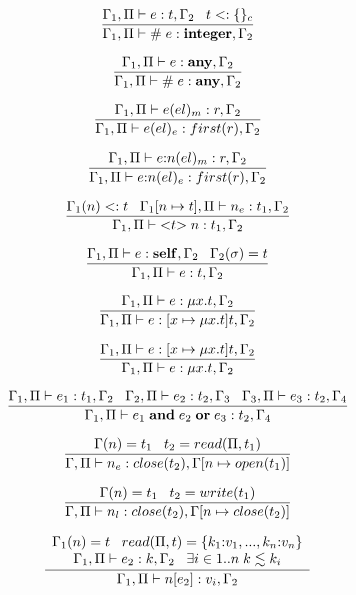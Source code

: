 \[
\dfrac{\Gamma_{1}, \Pi \vdash e:t, \Gamma_{2} \;\;\;
       t <: \{\}_{c}}
      {\Gamma_{1}, \Pi \vdash \# \; e:\mathbf{integer}, \Gamma_{2}}
\]

\[
\dfrac{\Gamma_{1}, \Pi \vdash e:\mathbf{any}, \Gamma_{2}}
      {\Gamma_{1}, \Pi \vdash \# \; e:\mathbf{any}, \Gamma_{2}}
\]

\[
\dfrac{\Gamma_{1}, \Pi \vdash e(el)_{m}:r, \Gamma_{2}}
      {\Gamma_{1}, \Pi \vdash e(el)_{e}:first(r), \Gamma_{2}}
\]

\[
\dfrac{\Gamma_{1}, \Pi \vdash e{:}n(el)_{m}:r, \Gamma_{2}}
      {\Gamma_{1}, \Pi \vdash e{:}n(el)_{e}:first(r), \Gamma_{2}}
\]

\[
\dfrac{\Gamma_{1}(n) <: t \;\;\;
       \Gamma_{1}[n \mapsto t], \Pi \vdash n_{e}:t_{1}, \Gamma_{2}}
      {\Gamma_{1}, \Pi \vdash {<}t{>} \; n:t_{1}, \Gamma_{2}}
\]

\[
\dfrac{\Gamma_{1}, \Pi \vdash e:\mathbf{self}, \Gamma_{2} \;\;\;
       \Gamma_{2}(\sigma) = t}
      {\Gamma_{1}, \Pi \vdash e:t, \Gamma_{2}}
\]

\[
\dfrac{\Gamma_{1}, \Pi \vdash e:\mu x.t, \Gamma_{2}}
      {\Gamma_{1}, \Pi \vdash e:[x \mapsto \mu x.t]t, \Gamma_{2}}
\]

\[
\dfrac{\Gamma_{1}, \Pi \vdash e:[x \mapsto \mu x.t]t, \Gamma_{2}}
      {\Gamma_{1}, \Pi \vdash e:\mu x.t, \Gamma_{2}}
\]

\[
\dfrac{\Gamma_{1}, \Pi \vdash e_{1}:t_{1}, \Gamma_{2} \;\;\;
       \Gamma_{2}, \Pi \vdash e_{2}:t_{2}, \Gamma_{3} \;\;\;
       \Gamma_{3}, \Pi \vdash e_{3}:t_{2}, \Gamma_{4}}
      {\Gamma_{1}, \Pi \vdash e_{1} \; \mathbf{and} \; e_{2} \; \mathbf{or} \; e_{3}:t_{2}, \Gamma_{4}}
\]

\[
\dfrac{\Gamma(n) = t_{1} \;\;\; t_{2} = read(\Pi, t_{1})}
      {\Gamma, \Pi \vdash n_{e}:close(t_{2}), \Gamma[n \mapsto open(t_{1})]}
\]

\[
\dfrac{\Gamma(n) = t_{1} \;\;\; t_{2} = write(t_{1})}
      {\Gamma, \Pi \vdash n_{l}:close(t_{2}), \Gamma[n \mapsto close(t_{2})]}
\]

\[
\dfrac{\begin{array}{c}
       \Gamma_{1}(n) = t \;\;\;
       read(\Pi, t) = \{k_{1}{:}v_{1}, ..., k_{n}{:}v_{n}\}\\
       \Gamma_{1}, \Pi \vdash e_{2}:k, \Gamma_{2} \;\;\;
       \exists i \in 1{..}n \; k \lesssim k_{i}
       \end{array}}
      {\Gamma_{1}, \Pi \vdash n[e_{2}]:v_{i}, \Gamma_{2}}
\]

